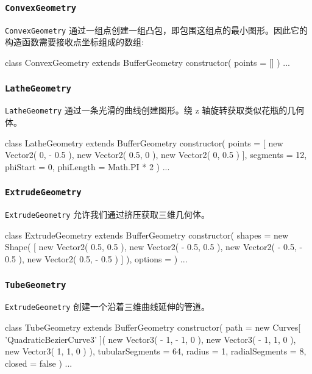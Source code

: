 \subsubsection*{\texttt{ConvexGeometry}}

\texttt{ConvexGeometry} 通过一组点创建一组凸包，即包围这组点的最小图形。因此它的构造函数需要接收点坐标组成的数组:

\begin{JavaScript}
class ConvexGeometry extends BufferGeometry {
	constructor( points = [] )
  ... 
}
\end{JavaScript}

\subsubsection*{\texttt{LatheGeometry}}

\texttt{LatheGeometry} 通过一条光滑的曲线创建图形。绕 z 轴旋转获取类似花瓶的几何体。

\begin{JavaScript}
class LatheGeometry extends BufferGeometry {
	constructor( points = [ new Vector2( 0, - 0.5 ), new Vector2( 0.5, 0 ), new Vector2( 0, 0.5 ) ], segments = 12, phiStart = 0, phiLength = Math.PI * 2 )
  ... 
}
\end{JavaScript}

\subsubsection*{\texttt{ExtrudeGeometry}}

\texttt{ExtrudeGeometry} 允许我们通过挤压获取三维几何体。

\begin{JavaScript}
class ExtrudeGeometry extends BufferGeometry {
  constructor( shapes = new Shape( [ new Vector2( 0.5, 0.5 ), new Vector2( - 0.5, 0.5 ), new Vector2( - 0.5, - 0.5 ), new Vector2( 0.5, - 0.5 ) ] ), options = {} )
  ...
} 
\end{JavaScript}

\subsubsection*{\texttt{TubeGeometry}}

\texttt{ExtrudeGeometry} 创建一个沿着三维曲线延伸的管道。

\begin{JavaScript}
class TubeGeometry extends BufferGeometry {
  constructor( path = new Curves[ 'QuadraticBezierCurve3' ]( new Vector3( - 1, - 1, 0 ), new Vector3( - 1, 1, 0 ), new Vector3( 1, 1, 0 ) ), tubularSegments = 64, radius = 1, radialSegments = 8, closed = false )
  ... 
} 
\end{JavaScript}

